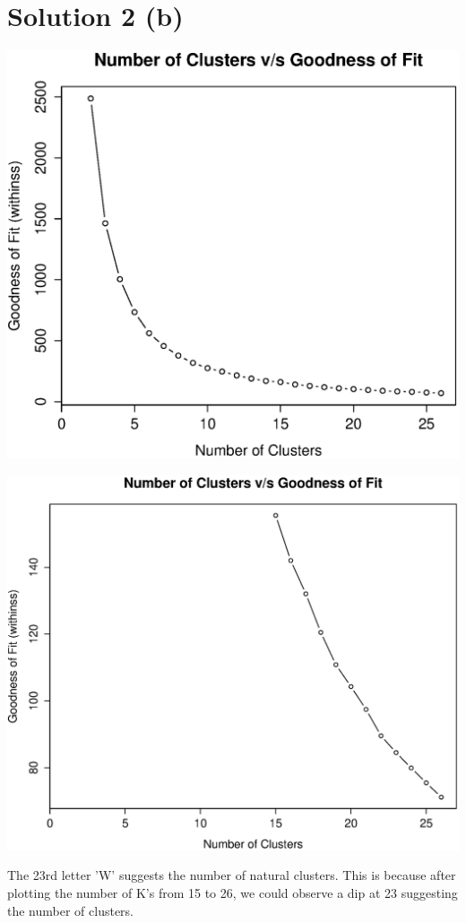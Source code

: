 \documentclass[a4paper,20pt]{article}
\begin{document}
\section*{Solution 2 (b)}
\begin{center}
\includegraphics[scale=0.7]{cluster_goodness.eps}
\end{center}
\begin{center}
\includegraphics[scale=0.7]{kmeans_cluster.eps}
\end{center}
The 23rd letter 'W' suggests the number of natural clusters. This is because
after plotting the number of K's from 15 to 26, we could observe a dip at 23 suggesting
the number of clusters.
\newpage
\end{document}

